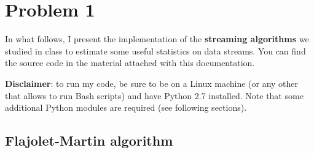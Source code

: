 
\section{Problem 1}

In what follows, I present the implementation of the \textbf{streaming algorithms} we studied in class to estimate some useful statistics on data streams. You can find the source code in the material attached with this documentation.\medskip

\noindent\textbf{Disclaimer}: to run my code, be sure to be on a Linux machine (or any other that allows to run Bash scripts) and have Python 2.7 installed. Note that some additional Python modules are required (see following sections).


\subsection{Flajolet-Martin algorithm}

